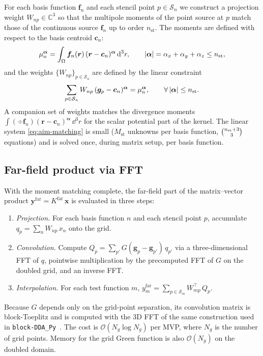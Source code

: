 \documentclass[11pt,a4paper]{article}
\begin{document}
For each basis function $\bm{f}_n$ and each stencil point
$p\in\mathcal{S}_n$ we construct a projection weight
$W_{np}\in\mathbb{C}^{3}$ so that the multipole moments of the point
source at $p$ match those of the continuous source $\bm{f}_n$ up to
order $n_{\text{st}}$. The moments are defined with respect to the
basis centroid $\bm{c}_n$:
\begin{equation}
  \mu_n^{\bm{\alpha}}
    = \int_{\Omega}\bm{f}_n(\bm{r})\,(\bm{r}-\bm{c}_n)^{\bm{\alpha}}\,
      \dd^{3}r,
  \qquad
  \abs{\bm{\alpha}}=\alpha_x+\alpha_y+\alpha_z \le n_{\text{st}},
  \label{eq:aim-moments}
\end{equation}
and the weights $\{W_{np}\}_{p\in\mathcal{S}_n}$ are defined by the
linear constraint
\begin{equation}
  \sum_{p\in\mathcal{S}_n} W_{np}\,(\bm{g}_p - \bm{c}_n)^{\bm{\alpha}}
    = \mu_n^{\bm{\alpha}},
  \qquad \forall\,\abs{\bm{\alpha}}\le n_{\text{st}}.
  \label{eq:aim-matching}
\end{equation}
A companion set of weights matches the divergence moments
$\int (\div\bm{f}_n)(\bm{r}-\bm{c}_n)^{\bm{\alpha}}\,\dd^{3}r$ for the
scalar potential part of the kernel. The linear system
\eqref{eq:aim-matching} is small ($M_{\text{st}}$ unknowns per basis
function, $\tbinom{n_{\text{st}}+3}{3}$ equations) and is solved once,
during matrix setup, per basis function.

\subsection{Far-field product via FFT}
\label{sec:aim-fft}

With the moment matching complete, the far-field part of the
matrix--vector product $\bm{y}^{\text{far}} = K^{\text{far}}\,\bm{x}$ is
evaluated in three steps:
\begin{enumerate}
  \item \emph{Projection.} For each basis function $n$ and each stencil
        point $p$, accumulate
        $q_p = \sum_n W_{np}\,x_n$ onto the grid.
  \item \emph{Convolution.} Compute
        $Q_p = \sum_{p'} G(\bm{g}_p - \bm{g}_{p'})\,q_{p'}$ via a
        three-dimensional FFT of $q$, pointwise multiplication by the
        precomputed FFT of $G$ on the doubled grid, and an inverse FFT.
  \item \emph{Interpolation.} For each test function $m$,
        $y_m^{\text{far}} = \sum_{p\in\mathcal{S}_m} W_{mp}^{\top}\,Q_p$.
\end{enumerate}
Because $G$ depends only on the grid-point separation, its convolution
matrix is block-Toeplitz and is computed with the $3$D FFT of the same
construction used in \texttt{block-DDA\_Py}~\cite{Goodman1991}. The cost
is $\mathcal{O}(N_g \log N_g)$ per MVP, where $N_g$ is the number of
grid points. Memory for the grid Green function is also
$\mathcal{O}(N_g)$ on the doubled domain.
\end{document}
